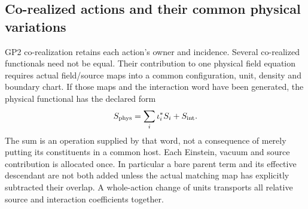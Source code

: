 \documentclass[12pt,a4paper]{article}
\begin{document}
\subsection{Co-realized actions and their common physical variations}
\label{p3a:sec:v2216-common-action}

GP2 co-realization retains each action's owner and incidence. Several
co-realized functionals need not be equal. Their contribution to one physical
field equation requires actual field/source maps into a common configuration,
unit, density and boundary chart. If those maps and the interaction word have
been generated, the physical functional has the declared form
\[
 S_{\rm phys}=\sum_i\iota_i^*S_i+S_{\rm int}.
\]
The sum is an operation supplied by that word, not a consequence of merely
putting its constituents in a common host. Each Einstein, vacuum and source
contribution is allocated once. In particular a bare parent term and its
effective descendant are not both added unless the actual matching map has
explicitly subtracted their overlap. A whole-action change of units transports
all relative source and interaction coefficients together.
\end{document}
